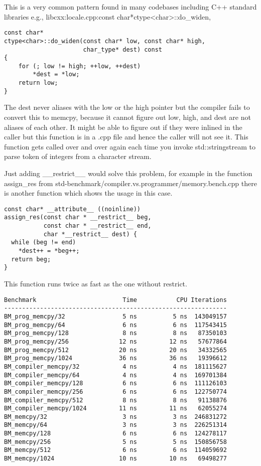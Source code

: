\documentclass{sig-alternate}
\begin{document}
This is a very common pattern found in many codebases including C++ standard libraries e.g.,
libcxx:locale.cpp:const char*ctype<char>::do\_widen,

\begin{verbatim}
const char*
ctype<char>::do_widen(const char* low, const char* high,
                      char_type* dest) const
{
    for (; low != high; ++low, ++dest)
        *dest = *low;
    return low;
}
\end{verbatim}

The dest never aliases with the low or the high pointer but the compiler fails to convert
this to memcpy, because it cannot figure out low, high, and dest are not aliases of each other.
It might be able to figure out if they were inlined in the caller but this function is in a .cpp
file and hence the caller will not see it. This function gets called over and over again
each time you invoke std::stringstream to parse token of integers from a character stream.

Just adding \_\_restrict\_\_ would solve this problem, for example in the function assign\_res from
std-benchmark/compiler.vs.programmer/memory.bench.cpp there is another function which shows the
usage in this case.

\begin{verbatim}
const char* __attribute__ ((noinline))
assign_res(const char * __restrict__ beg,
           const char * __restrict__ end,
           char *__restrict__ dest) {
  while (beg != end)
    *dest++ = *beg++;
  return beg;
}
\end{verbatim}

This function runs twice as fast as the one without restrict.

\begin{verbatim}
Benchmark                        Time           CPU Iterations
--------------------------------------------------------------
BM_prog_memcpy/32                5 ns          5 ns  143049157
BM_prog_memcpy/64                6 ns          6 ns  117543415
BM_prog_memcpy/128               8 ns          8 ns   87350103
BM_prog_memcpy/256              12 ns         12 ns   57677864
BM_prog_memcpy/512              20 ns         20 ns   34332565
BM_prog_memcpy/1024             36 ns         36 ns   19396612
BM_compiler_memcpy/32            4 ns          4 ns  181115627
BM_compiler_memcpy/64            4 ns          4 ns  169701384
BM_compiler_memcpy/128           6 ns          6 ns  111126103
BM_compiler_memcpy/256           6 ns          6 ns  122750774
BM_compiler_memcpy/512           8 ns          8 ns   91138876
BM_compiler_memcpy/1024         11 ns         11 ns   62055274
BM_memcpy/32                     3 ns          3 ns  246831272
BM_memcpy/64                     3 ns          3 ns  226251314
BM_memcpy/128                    6 ns          6 ns  124278117
BM_memcpy/256                    5 ns          5 ns  150856758
BM_memcpy/512                    6 ns          6 ns  114059692
BM_memcpy/1024                  10 ns         10 ns   69498277
\end{verbatim}
\end{document}
